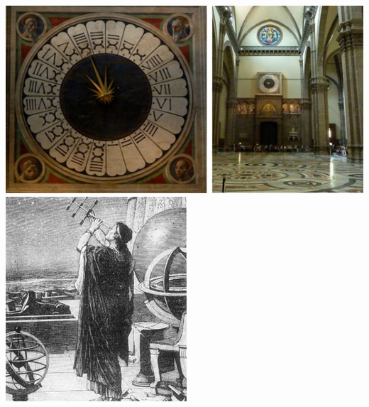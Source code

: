 \documentclass[11pt]{article}
\begin{document}
\newpage
\includegraphics{one.jpg}
\newpage
\includegraphics{hipparchus.jpg}
\end{document}
